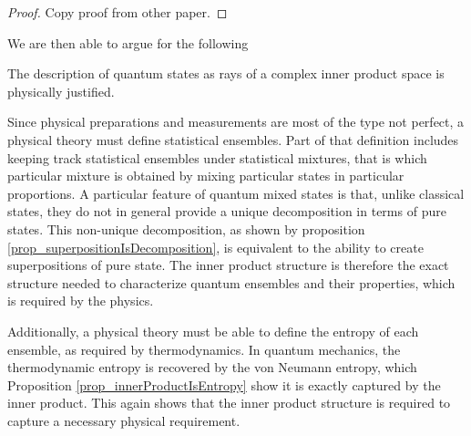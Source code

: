 \documentclass[10pt,twocolumn, nofootinbib]{revtex4-2}
\begin{document}
\begin{proof}
	Copy proof from other paper.
\end{proof}

We are then able to argue for the following
\begin{prop}
	The description of quantum states as rays of a complex inner product space is physically justified.
\end{prop}
\begin{justification}
	Since physical preparations and measurements are most of the type not perfect, a physical theory must define statistical ensembles. Part of that definition includes keeping track statistical ensembles under statistical mixtures, that is which particular mixture is obtained by mixing particular states in particular proportions. A particular feature of quantum mixed states is that, unlike classical states, they do not in general provide a unique decomposition in terms of pure states. This non-unique decomposition, as shown by proposition \ref{prop_superpositionIsDecomposition}, is equivalent to the ability to create superpositions of pure state. The inner product structure is therefore the exact structure needed to characterize quantum ensembles and their properties, which is required by the physics.
	
	Additionally, a physical theory must be able to define the entropy of each ensemble, as required by thermodynamics. In quantum mechanics, the thermodynamic entropy is recovered by the von Neumann entropy, which Proposition \ref{prop_innerProductIsEntropy} show it is exactly captured by the inner product. This again shows that the inner product structure is required to capture a necessary physical requirement.
\end{justification}
\end{document}
